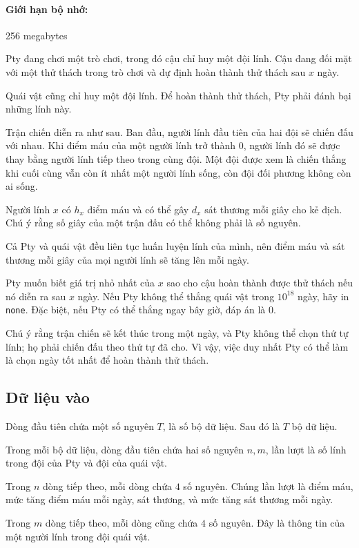 \documentclass[11pt]{article}
\begin{document}
\paragraph{Giới hạn bộ nhớ:} 256 megabytes

Pty đang chơi một trò chơi, trong đó cậu chỉ huy một đội lính. Cậu đang đối
mặt với một thử thách trong trò chơi và dự định hoàn thành thử thách sau
\(x\) ngày.

Quái vật cũng chỉ huy một đội lính. Để hoàn thành thử thách, Pty phải đánh
bại những lính này.

Trận chiến diễn ra như sau. Ban đầu, người lính đầu tiên của hai đội sẽ chiến
đấu với nhau. Khi điểm máu của một người lính trở thành \(0\), người lính đó
sẽ được thay bằng người lính tiếp theo trong cùng đội. Một đội được xem là
chiến thắng khi cuối cùng vẫn còn ít nhất một người lính sống, còn đội đối
phương không còn ai sống.

Người lính \(x\) có \(h_x\) điểm máu và có thể gây \(d_x\) sát thương mỗi
giây cho kẻ địch. Chú ý rằng số giây của một trận đấu có thể không phải là
số nguyên.

Cả Pty và quái vật đều liên tục huấn luyện lính của mình, nên điểm máu và sát
thương mỗi giây của mọi người lính sẽ tăng lên mỗi ngày.

Pty muốn biết giá trị nhỏ nhất của \(x\) sao cho cậu hoàn thành được thử
thách nếu nó diễn ra sau \(x\) ngày. Nếu Pty không thể thắng quái vật trong
\(10^{18}\) ngày, hãy in \texttt{none}. Đặc biệt, nếu Pty có thể thắng ngay
bây giờ, đáp án là \(0\).

Chú ý rằng trận chiến sẽ kết thúc trong một ngày, và Pty không thể chọn thứ
tự lính; họ phải chiến đấu theo thứ tự đã cho. Vì vậy, việc duy nhất Pty có
thể làm là chọn ngày tốt nhất để hoàn thành thử thách.

\subsection*{Dữ liệu vào}

Dòng đầu tiên chứa một số nguyên \(T\), là số bộ dữ liệu. Sau đó là \(T\) bộ
dữ liệu.

Trong mỗi bộ dữ liệu, dòng đầu tiên chứa hai số nguyên \(n,m\), lần lượt là
số lính trong đội của Pty và đội của quái vật.

Trong \(n\) dòng tiếp theo, mỗi dòng chứa \(4\) số nguyên. Chúng lần lượt là
điểm máu, mức tăng điểm máu mỗi ngày, sát thương, và mức tăng sát thương mỗi
ngày.

Trong \(m\) dòng tiếp theo, mỗi dòng cũng chứa \(4\) số nguyên. Đây là thông
tin của một người lính trong đội quái vật.
\end{document}
